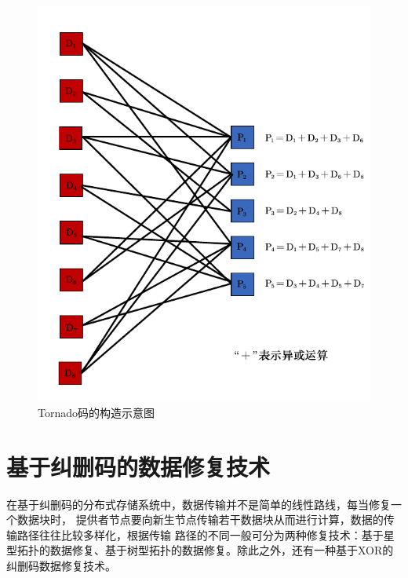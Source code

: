 \begin{figure}[htbp]
	\centering
	\includegraphics [scale=0.8]{figures/1.8.pdf}
	\caption{Tornado码的构造示意图}
	\label{fig:con-1.8}
\end{figure}

\section{基于纠删码的数据修复技术}
在基于纠删码的分布式存储系统中，数据传输并不是简单的线性路线，每当修复一个数据块时，
提供者节点要向新生节点传输若干数据块从而进行计算，数据的传输路径往往比较多样化，根据传输
路径的不同一般可分为两种修复技术：基于星型拓扑的数据修复、基于树型拓扑的数据修复。除此之外，还有一种基于XOR的纠删码数据修复技术。

